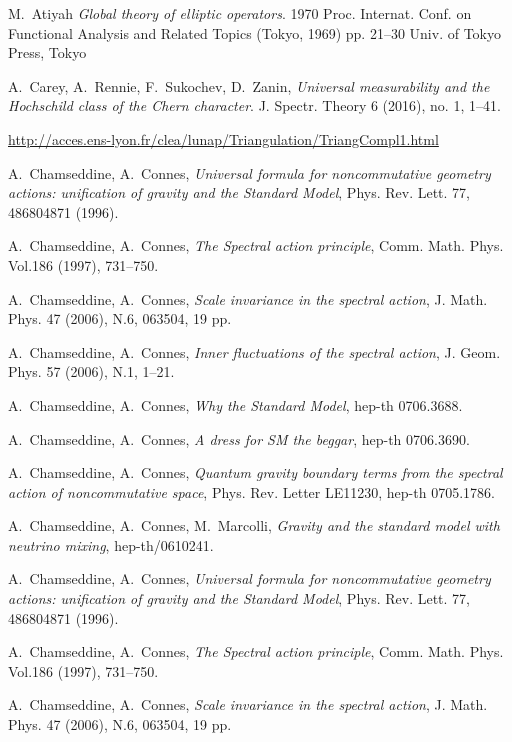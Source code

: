\documentclass[12pt]{article}
\begin{document}
 \begin{thebibliography}{99}
 
  M.~Atiyah {\em Global theory of elliptic operators}. 1970 Proc. Internat. Conf. on Functional Analysis and Related Topics (Tokyo, 1969) pp. 21–30 Univ. of Tokyo Press, Tokyo 
 


 A.~Carey,  A.~Rennie, F.~Sukochev, D.~Zanin,   {\em Universal measurability and the Hochschild class of the Chern character}. J. Spectr. Theory 6 (2016), no. 1, 1--41.

 \url{http://acces.ens-lyon.fr/clea/lunap/Triangulation/TriangCompl1.html}
 
   A.~Chamseddine, A.~Connes, {\em  Universal
formula for noncommutative geometry actions: unification of gravity
and the Standard Model}, Phys. Rev. Lett. 77, 486804871 (1996).

 A.~Chamseddine, A.~Connes, {\em  The Spectral
action principle}, Comm. Math. Phys. Vol.186 (1997), 731--750.

 A.~Chamseddine, A.~Connes, {\em  Scale invariance
in the spectral action},  J. Math. Phys.  47  (2006),  N.6, 063504,
19 pp.

 A.~Chamseddine, A.~Connes,
{\em Inner fluctuations of the spectral action}, J. Geom. Phys.  57
(2006),  N.1, 1--21.

 A.~Chamseddine, A.~Connes, {\em Why the Standard
Model}, hep-th 0706.3688.

 A.~Chamseddine, A.~Connes, {\em A dress for SM the
beggar}, hep-th 0706.3690.

 A.~Chamseddine, A.~Connes, {\em Quantum gravity
boundary terms from the spectral action of noncommutative space},
Phys. Rev. Letter LE11230, hep-th 0705.1786.

 A.~Chamseddine, A.~Connes, M.~Marcolli,
{\em Gravity and the standard model with neutrino mixing},
hep-th/0610241.

  A.~Chamseddine, A.~Connes, {\em  Universal
formula for noncommutative geometry actions: unification of gravity
and the Standard Model}, Phys. Rev. Lett. 77, 486804871 (1996).

 A.~Chamseddine, A.~Connes, {\em  The Spectral
action principle}, Comm. Math. Phys. Vol.186 (1997), 731--750.

 A.~Chamseddine, A.~Connes, {\em  Scale invariance
in the spectral action},  J. Math. Phys.  47  (2006),  N.6, 063504,
19 pp.


\end{thebibliography}
\end{document}

